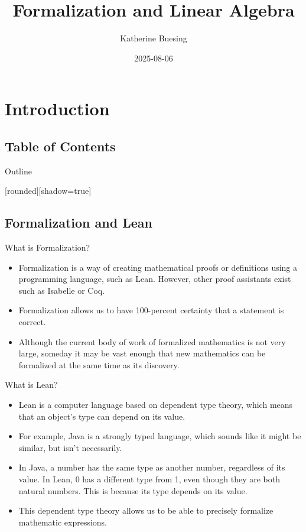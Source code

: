 \documentclass[svgnames]{beamer}
\author{Katherine Buesing}
\date{2025-08-06}
\title{Formalization and Linear Algebra}
\begin{document}
\section{Introduction}
\subsection{Table of Contents}
\maketitle
\begin{frame}{Outline}

{\scriptsize
\tableofcontents
}

\end{frame}

[rounded][shadow=true]


\subsection{Formalization and Lean}
\begin{frame}{What is Formalization?}
\begin{itemize}[<+->]
\item Formalization is a way of creating mathematical proofs or definitions using a programming language, such as Lean. However, other proof assistants exist such as Isabelle or Coq. 
\item Formalization allows us to have 100-percent certainty that a statement is correct.
\item Although the current body of work of formalized mathematics is not very large, someday it may be vast enough that new mathematics can be formalized at the same time as its discovery.
\end{itemize}
\end{frame}

\begin{frame}[label={sec:o},fragile]{What is Lean?}

\begin{itemize}[<+->]
\item Lean is a computer language based on dependent type theory, which means that an object's type can depend on its value.
\item For example, Java is a strongly typed language, which sounds like it might be similar, but isn't necessarily.
\item In Java, a number has the same type as another number, regardless of its value. In Lean, 0 has a different type from 1, even though they are both natural numbers. This is because its type depends on its value. 
\item This dependent type theory allows us to be able to precisely formalize mathematic expressions. 

\end{itemize}
\end{frame}
\end{document}

